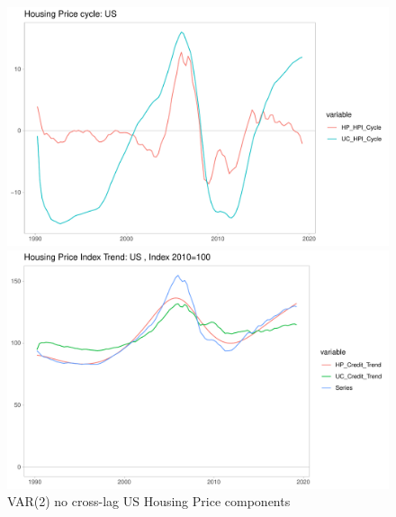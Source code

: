 \documentclass[fleqn]{article}
\begin{document}
\begin{outline}[enumerate]
\begin{figure}[h!]
\caption{VAR(2) no cross-lag US Housing Price components}	
\centerline{\includegraphics[scale=0.7]{../Output/Graphs/HP_cycle_US.pdf}}
\centerline{\includegraphics[scale=0.7]{../Output/Graphs/HP_trend_US.pdf}}
\end{figure}


\end{outline}
\end{document}
